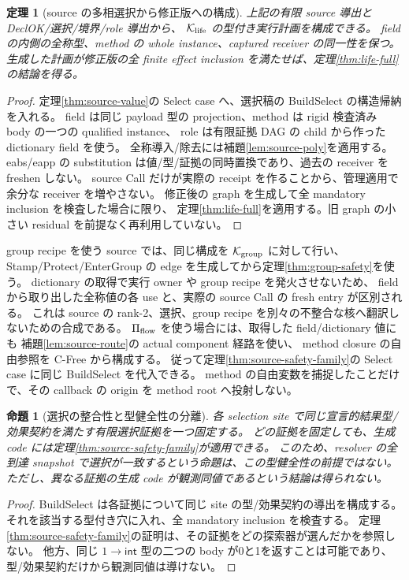 \documentclass[11pt,a4paper]{article}
\newtheorem{theorem}[definition]{定理}
\newtheorem{proposition}[definition]{命題}
\newcommand{\Core}{\mathcal K}
\begin{document}
\begin{theorem}[source の多相選択から修正版への構成]
\label{thm:selection-source}
上記の有限 source 導出と DeclOK/選択/境界/role 導出から、
\(\Core_{\rm life}\) の型付き実行計画を構成できる。
field の内側の全称型、method の whole instance、captured receiver の同一性を保つ。
生成した計画が修正版の全 finite effect inclusion を満たせば、定理\ref{thm:life-full}の結論を得る。
\end{theorem}
\begin{proof}
定理\ref{thm:source-value}の Select case へ、選択稿の BuildSelect の構造帰納を入れる。
field は同じ payload 型の projection、method は rigid 検査済み body の一つの qualified instance、
role は有限証拠 DAG の child から作った dictionary field を使う。
全称導入/除去には補題\ref{lem:source-poly}を適用する。
eabs/eapp の substitution は値/型/証拠の同時置換であり、過去の receiver を freshen しない。
source Call だけが実際の receipt を作ることから、管理適用で余分な receiver を増やさない。
修正後の graph を生成して全 mandatory inclusion を検査した場合に限り、
定理\ref{thm:life-full}を適用する。旧 graph の小さい residual を前提なく再利用していない。
\end{proof}

group recipe を使う source では、同じ構成を \(\Core_{\rm group}\) に対して行い、
Stamp/Protect/EnterGroup の edge を生成してから定理\ref{thm:group-safety}を使う。
dictionary の取得で実行 owner や group recipe を発火させないため、
field から取り出した全称値の各 use と、実際の source Call の fresh entry が区別される。
これは source の rank-2、選択、group recipe を別々の不整合な核へ翻訳しないための合成である。
\(\Pi_{\rm flow}\) を使う場合には、取得した field/dictionary 値にも
補題\ref{lem:source-route}の actual component 経路を使い、
method closure の自由参照を C-Free から構成する。
従って定理\ref{thm:source-safety-family}の Select case に同じ BuildSelect を代入できる。
method の自由変数を捕捉したことだけで、その callback の origin を method root へ投射しない。

\begin{proposition}[選択の整合性と型健全性の分離]
\label{prop:selection-policy}
各 selection site で同じ宣言的結果型/効果契約を満たす有限選択証拠を一つ固定する。
どの証拠を固定しても、生成 code には定理\ref{thm:source-safety-family}が適用できる。
このため、resolver の全到達 snapshot で選択が一致するという命題は、この型健全性の前提ではない。
ただし、異なる証拠の生成 code が観測同値であるという結論は得られない。
\end{proposition}
\begin{proof}
BuildSelect は各証拠について同じ site の型/効果契約の導出を構成する。
それを該当する型付き穴に入れ、全 mandatory inclusion を検査する。
定理\ref{thm:source-safety-family}の証明は、その証拠をどの探索器が選んだかを参照しない。
他方、同じ \(1\to\mathsf{int}\) 型の二つの body が0と1を返すことは可能であり、
型/効果契約だけから観測同値は導けない。
\end{proof}
\end{document}
